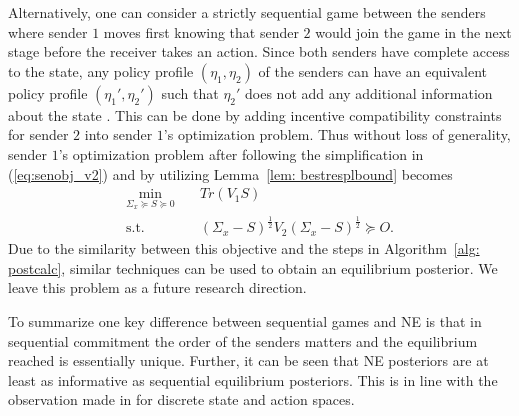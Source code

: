 \documentclass[12pt,journal,onecolumn]{IEEEtran}
\begin{document}
Alternatively, one can consider a strictly sequential game between the senders where sender $1$ moves first knowing that sender $2$ would join the game in the next stage before the receiver takes an action. Since both senders have complete access to the state, any policy profile $(\eta_1,\eta_2)$ of the senders can have an equivalent policy profile $(\eta_1',\eta_2')$ such that $\eta_2'$ does not add any additional information about the state \cite{li2021sequential}. This can be done by adding incentive compatibility constraints for sender $2$ into sender $1$'s optimization problem. Thus without loss of generality, sender $1$'s optimization problem after following the simplification in (\ref{eq:senobj_v2}) and by utilizing Lemma~\ref{lem: bestresplbound} becomes
\begin{align*}
    \min_{\Sigma_x\succeq S\succeq 0}\quad& Tr(V_1S)\\
     \text{s.t.}\quad& (\Sigma_x-S)^\frac{1}{2}V_2(\Sigma_x-S)^\frac{1}{2}\succeq O.
\end{align*}
Due to the similarity between this objective and the steps in Algorithm~\ref{alg: postcalc}, similar techniques can be used to obtain an equilibrium posterior. We leave this problem as a future research direction.


To summarize one key difference between sequential games and NE is that in sequential commitment the order of the senders matters and the equilibrium reached is essentially unique. Further, it can be seen that NE posteriors are at least as informative as sequential equilibrium posteriors. This is in line with the observation made in \cite{li2021sequential} for discrete state and action spaces.
\end{document}

